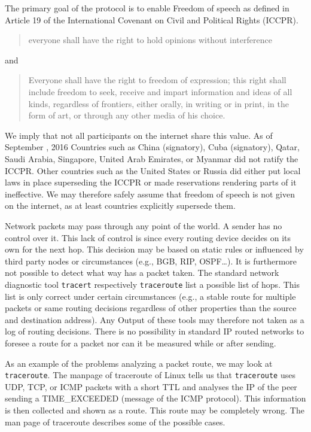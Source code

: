 The primary goal of the protocol is to enable Freedom of speech as defined in Article 19 of the International Covenant on Civil and Political Rights (ICCPR)\cite{iccpr}.
\begin{quote}
	everyone shall have the right to hold opinions without interference 
\end{quote}
and
\begin{quote}
	Everyone shall have the right to freedom of expression; this right shall include freedom to seek, receive and impart information and ideas of all kinds, regardless of frontiers, either orally, in writing or in print, in the form of art, or through any other media of his choice.
\end{quote}

We imply that not all participants on the internet share this value. As of September , 2016 Countries such as China (signatory), Cuba (signatory), Qatar, Saudi Arabia, Singapore, United Arab Emirates, or Myanmar did not ratify the ICCPR. Other countries such as the United States or Russia did either put local laws in place superseding the ICCPR or made reservations rendering parts of it ineffective. We may therefore safely assume that freedom of speech is not given on the internet, as at least countries explicitly supersede them.

Network packets may pass through any point of the world. A sender has no control over it. This lack of control is since every routing device decides on its own for the next hop. This decision may be based on static rules or influenced by third party nodes or circumstances (e.g., BGB, RIP, OSPF\ldots). It is furthermore not possible to detect what way has a packet taken. The standard network diagnostic tool \verb|tracert| respectively \verb|traceroute| list a possible list of hops. This list is only correct under certain circumstances (e.g., a stable route for multiple packets or same routing decisions regardless of other properties than the source and destination address). Any Output of these tools may therefore not taken as a log of routing decisions. There is no possibility in standard IP routed networks to foresee a route for a packet nor can it be measured while or after sending. 

As an example of the problems analyzing a packet route, we may look at \verb|traceroute|. The manpage of traceroute of Linux tells us that \verb|traceroute| uses UDP, TCP, or ICMP packets with a short TTL and analyses the IP of the peer sending a TIME\_EXCEEDED (message of the ICMP protocol). This information is then collected and shown as a route. This route may be completely wrong. The man page of traceroute describes some of the possible cases.

